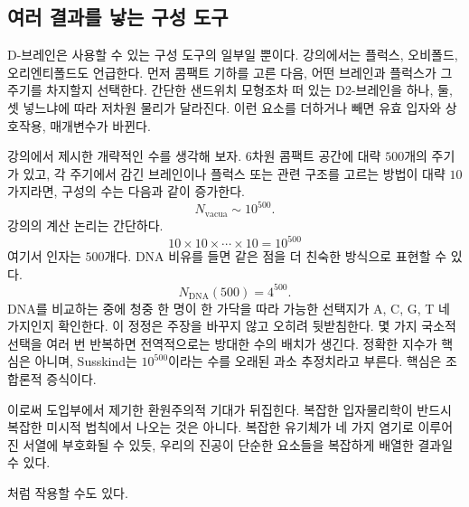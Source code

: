 \subsection{여러 결과를 낳는 구성 도구}

D-브레인은 사용할 수 있는 구성 도구의 일부일 뿐이다. 강의에서는 플럭스, 오비폴드, 오리엔티폴드도 언급한다. 먼저 콤팩트 기하를 고른 다음, 어떤 브레인과 플럭스가 그 주기를 차지할지 선택한다. 간단한 샌드위치 모형조차 떠 있는 D2-브레인을 하나, 둘, 셋 넣느냐에 따라 저차원 물리가 달라진다. 이런 요소를 더하거나 빼면 유효 입자와 상호작용, 매개변수가 바뀐다.

강의에서 제시한 개략적인 수를 생각해 보자. 6차원 콤팩트 공간에 대략 \(500\)개의 주기가 있고, 각 주기에서 감긴 브레인이나 플럭스 또는 관련 구조를 고르는 방법이 대략 \(10\)가지라면, 구성의 수는 다음과 같이 증가한다.
\begin{equation}
N_{\mathrm{vacua}} \sim 10^{500}.
\end{equation}
강의의 계산 논리는 간단하다.
\begin{equation}
10 \times 10 \times \cdots \times 10 = 10^{500}
\end{equation}
여기서 인자는 \(500\)개다. DNA 비유를 들면 같은 점을 더 친숙한 방식으로 표현할 수 있다.
\begin{equation}
N_{\mathrm{DNA}}(500)=4^{500}.
\end{equation}
DNA를 비교하는 중에 청중 한 명이 한 가닥을 따라 가능한 선택지가 A, C, G, T 네 가지인지 확인한다. 이 정정은 주장을 바꾸지 않고 오히려 뒷받침한다. 몇 가지 국소적 선택을 여러 번 반복하면 전역적으로는 방대한 수의 배치가 생긴다. 정확한 지수가 핵심은 아니며, Susskind는 \(10^{500}\)이라는 수를 오래된 과소 추정치라고 부른다. 핵심은 조합론적 증식이다.

이로써 도입부에서 제기한 환원주의적 기대가 뒤집힌다. 복잡한 입자물리학이 반드시 복잡한 미시적 법칙에서 나오는 것은 아니다. 복잡한 유기체가 네 가지 염기로 이루어진 서열에 부호화될 수 있듯, 우리의 진공이 단순한 요소들을 복잡하게 배열한 결과일 수 있다.

\begin{classroomqa}
처럼 작용할 수도 있다.\end{classroomqa}

